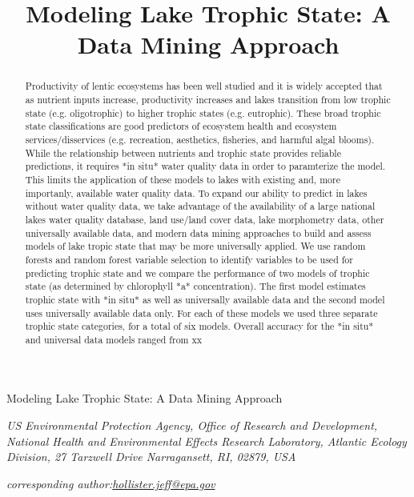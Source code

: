 \documentclass[11pt,]{article}
\title{Modeling Lake Trophic State: A Data Mining Approach}
\author{}
\date{}
\begin{document}
\begin{center}
\huge Modeling Lake Trophic State: A Data Mining Approach \\[0.2cm]
\normalsize
\end{center}


\emph{US Environmental Protection Agency, Office of Research and
Development, National Health and Environmental Effects Research
Laboratory, Atlantic Ecology Division, 27 Tarzwell Drive Narragansett,
RI, 02879, USA}

\emph{corresponding
author:\href{mailto:hollister.jeff@epa.gov}{hollister.jeff@epa.gov}}

\begin{singlespace}
\begin{abstract}
Productivity of lentic ecosystems has been well studied and it is widely accepted that as nutrient inputs increase,  productivity increases and lakes transition from low trophic state (e.g. oligotrophic) to higher trophic states  (e.g. eutrophic). These broad trophic state classifications are good predictors of ecosystem health and ecosystem services/disservices (e.g. recreation, aesthetics, fisheries, and harmful algal blooms). While the relationship between  nutrients and trophic state provides reliable predictions, it requires *in situ* water quality data in order to paramterize the model.  This limits the application of these models to lakes with existing and, more importanly, available water quality data.  To expand our ability to predict in lakes without water quality data, we take advantage of the availability of a large national lakes water quality database, land use/land cover data, lake morphometry data, other universally available data, and modern data mining approaches to build and assess models of lake tropic state that may be more universally applied.  We use random forests and random forest variable selection to identify variables to be used for predicting trophic state and we compare the performance of two models of trophic state (as determined by chlorophyll *a* concentration).   The first model estimates trophic state with *in situ* as well as universally available data and the second model uses universally available data only. For each of these models we used three separate trophic state categories, for a total of six models. Overall accuracy for the *in situ* and universal data models ranged from xx%

\end{abstract}
\end{singlespace}
\end{document}
